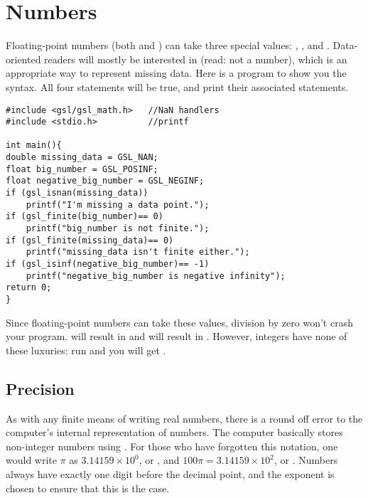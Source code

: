\section{\treesymbol Numbers}       \label{numbers}
Floating-point numbers (both  and ) can take three special values: , , and . Data-oriented readers will mostly be
interested in  (read: not a number), which is an appropriate way to represent missing data. Here is a
program to show you the syntax. All four  statements will be true, and print their associated
statements.
\begin{lstlisting}
#include <gsl/gsl_math.h>   //NaN handlers
#include <stdio.h>          //printf

int main(){
double missing_data = GSL_NAN;
float big_number = GSL_POSINF;
float negative_big_number = GSL_NEGINF;
if (gsl_isnan(missing_data))
    printf("I'm missing a data point.");
if (gsl_finite(big_number)== 0)
    printf("big_number is not finite.");
if (gsl_finite(missing_data)== 0)
    printf("missing_data isn't finite either.");
if (gsl_isinf(negative_big_number)== -1)
    printf("negative_big_number is negative infinity");
return 0;
}
\end{lstlisting}

Since floating-point numbers can take these values, division by zero
won't crash your program.  will result in
 and  will result in . However, integers have none of these luxuries: run  and you will get .

\subsection{Precision} 
As with any finite means of writing real numbers,
there is a round off error to the computer's internal representation of
numbers. The computer basically stores non-integer numbers using
. For those who have forgotten this notation, one
would write  $\pi$ as $3.14159 \times 10^0$, or , 
and $100\pi = 3.14159 \times 10^2$, or . 
Numbers always have exactly one digit before the decimal point, and the
exponent is chosen to ensure that this is the case.

